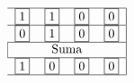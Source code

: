 \begin{frame}
\begin{solution}
\begin{center}
               \end{center}

                
                    
                \[
                \begin{tabular}{c c c c|}
                \hline
                \fbox{1} & \fbox{1} & \fbox{0} & \fbox{0} \\
                \hline
                \fbox{0} & \fbox{1} & \fbox{0} & \fbox{0} \\
                \hline
                \multicolumn{4}{|c|}{\text{Suma}} \\
                \hline
                \fbox{1} & \fbox{0} & \fbox{0} & \fbox{0} \\
                \hline
                \end{tabular}
                \]
                

 


               
	\end{solution}
\end{frame}